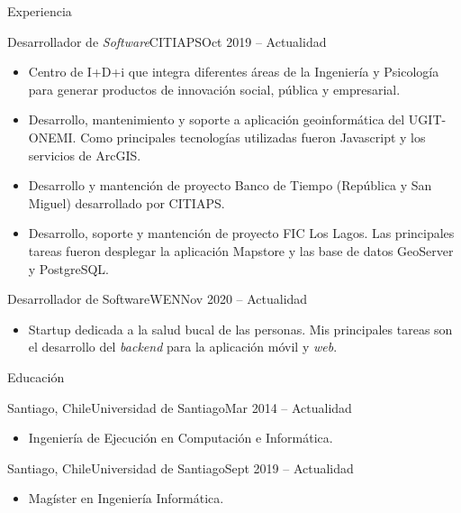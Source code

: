 \documentclass[]{mcdowellcv}
\begin{document}
	\makeheader
	
	\begin{cvsection}{Experiencia}
		\begin{cvsubsection}{Desarrollador de \textit{Software}}{CITIAPS}{Oct 2019 -- Actualidad}
			\begin{itemize}
				\item Centro de I+D+i que integra diferentes áreas de la Ingeniería y Psicología para generar productos de innovación social, pública y empresarial.
				\item Desarrollo, mantenimiento y soporte a aplicación geoinformática del UGIT-ONEMI. Como principales tecnologías utilizadas fueron Javascript y los servicios de ArcGIS.
				\item Desarrollo y mantención de proyecto Banco de Tiempo (República y San Miguel) desarrollado por CITIAPS.
				\item Desarrollo, soporte y mantención de proyecto FIC Los Lagos. Las principales tareas fueron desplegar la aplicación Mapstore y las base de datos GeoServer y PostgreSQL.  
			\end{itemize}
		\end{cvsubsection}
		
		\begin{cvsubsection}{Desarrollador de Software}{WEN}{Nov 2020 -- Actualidad}		
			\begin{itemize}
				\item Startup dedicada a la salud bucal de las personas. Mis principales tareas son el desarrollo del \textit{backend} para la aplicación móvil y \textit{web}.
			\end{itemize}
		\end{cvsubsection}
	\end{cvsection}
	
	\begin{cvsection}{Educación}
		\begin{cvsubsection}{Santiago, Chile}{Universidad de Santiago}{Mar 2014 -- Actualidad}
			\begin{itemize}
				\item Ingeniería de Ejecución en Computación e Informática.
			\end{itemize}
		\end{cvsubsection}
		\begin{cvsubsection}{Santiago, Chile}{Universidad de Santiago}{Sept 2019 -- Actualidad}
			\begin{itemize}
				\item Magíster en Ingeniería Informática.
			\end{itemize}
		\end{cvsubsection}
	\end{cvsection}
	
\end{document}
